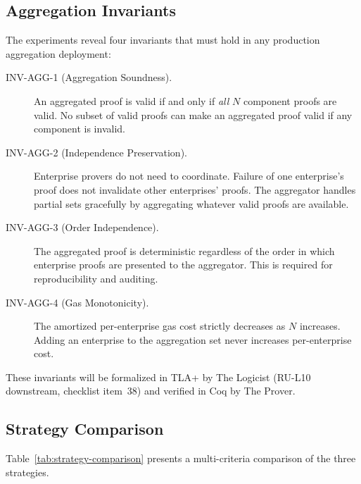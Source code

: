 \subsection{Aggregation Invariants}
\label{sec:invariants}

The experiments reveal four invariants that must hold in any production
aggregation deployment:

\begin{description}
  \item[INV-AGG-1 (Aggregation Soundness).] An aggregated proof is valid
    if and only if \emph{all} $N$ component proofs are valid. No subset
    of valid proofs can make an aggregated proof valid if any component
    is invalid.

  \item[INV-AGG-2 (Independence Preservation).] Enterprise provers do
    not need to coordinate. Failure of one enterprise's proof does not
    invalidate other enterprises' proofs. The aggregator handles partial
    sets gracefully by aggregating whatever valid proofs are available.

  \item[INV-AGG-3 (Order Independence).] The aggregated proof is
    deterministic regardless of the order in which enterprise proofs are
    presented to the aggregator. This is required for reproducibility
    and auditing.

  \item[INV-AGG-4 (Gas Monotonicity).] The amortized per-enterprise gas
    cost strictly decreases as $N$ increases. Adding an enterprise to
    the aggregation set never increases per-enterprise cost.
\end{description}

These invariants will be formalized in TLA+ by The Logicist (RU-L10
downstream, checklist item~38) and verified in Coq by The Prover.

\subsection{Strategy Comparison}

Table~\ref{tab:strategy-comparison} presents a multi-criteria comparison
of the three strategies.

